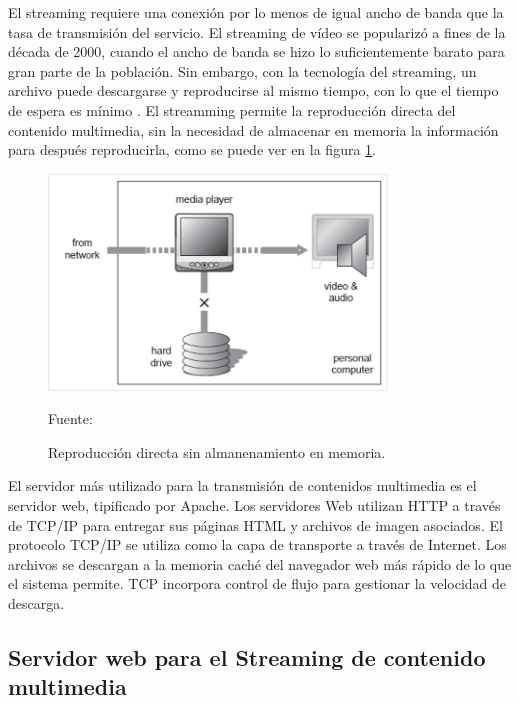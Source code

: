 El streaming requiere una conexión por lo menos de igual ancho de banda que la tasa de transmisión del servicio. El streaming de vídeo se popularizó a fines de la década de 2000, cuando el ancho de banda se hizo lo suficientemente barato para gran parte de la población. Sin embargo, con la tecnología del streaming, un archivo puede descargarse y reproducirse al mismo tiempo, con lo que el tiempo de espera es mínimo \cite{streamming:austerberry}. El streamming permite la reproducción directa del contenido multimedia, sin la necesidad de almacenar en memoria la información para después reproducirla, como se puede ver en la figura \ref{fig:stream}.\\

\begin{figure}[H]
    \begin{center}
        \includegraphics[width=9cm]{img/capitulo_2/stream.png}
    \end{center}
    \begin{center}
        \caption{Reproducción directa sin almanenamiento en memoria.}
        Fuente: \cite{streamming:austerberry}
        \label{fig:stream}
    \end{center}
\end{figure}

El servidor más utilizado para la transmisión de contenidos multimedia es el servidor web, tipificado por Apache. Los servidores Web utilizan HTTP a través de TCP/IP para entregar sus páginas HTML y archivos de imagen asociados. El protocolo TCP/IP se utiliza como la capa de transporte a través de Internet. Los archivos se descargan a la memoria caché del navegador web más rápido de lo que el sistema permite. TCP incorpora control de flujo para gestionar la velocidad de descarga.\\
\subsection{Servidor web para el Streaming de contenido multimedia}

